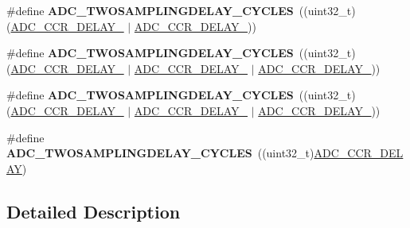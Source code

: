 \begin{DoxyCompactItemize}
\item 
\mbox{\label{group___a_d_c__delay__between__2__sampling__phases_gaba99083f97b9869ad8397a04601ad1cb}} 
\#define {\bfseries A\+D\+C\+\_\+\+T\+W\+O\+S\+A\+M\+P\+L\+I\+N\+G\+D\+E\+L\+A\+Y\+\_\+C\+Y\+C\+L\+ES}~((uint32\+\_\+t)(\mbox{\hyperlink{group___peripheral___registers___bits___definition_gae0216de7d6fcfa507c9aa1400972d862}{A\+D\+C\+\_\+\+C\+C\+R\+\_\+\+D\+E\+L\+A\+Y\+\_}} $\vert$ \mbox{\hyperlink{group___peripheral___registers___bits___definition_ga17f85cbda5dcf9a392a29befb73c6ceb}{A\+D\+C\+\_\+\+C\+C\+R\+\_\+\+D\+E\+L\+A\+Y\+\_}}))
\item 
\mbox{\label{group___a_d_c__delay__between__2__sampling__phases_ga3d4626768769515ca85ead5834564dd4}} 
\#define {\bfseries A\+D\+C\+\_\+\+T\+W\+O\+S\+A\+M\+P\+L\+I\+N\+G\+D\+E\+L\+A\+Y\+\_\+C\+Y\+C\+L\+ES}~((uint32\+\_\+t)(\mbox{\hyperlink{group___peripheral___registers___bits___definition_gae0216de7d6fcfa507c9aa1400972d862}{A\+D\+C\+\_\+\+C\+C\+R\+\_\+\+D\+E\+L\+A\+Y\+\_}} $\vert$ \mbox{\hyperlink{group___peripheral___registers___bits___definition_ga17f85cbda5dcf9a392a29befb73c6ceb}{A\+D\+C\+\_\+\+C\+C\+R\+\_\+\+D\+E\+L\+A\+Y\+\_}} $\vert$ \mbox{\hyperlink{group___peripheral___registers___bits___definition_ga22b71e9df8b1fca93802ad602341eb0b}{A\+D\+C\+\_\+\+C\+C\+R\+\_\+\+D\+E\+L\+A\+Y\+\_}}))
\item 
\mbox{\label{group___a_d_c__delay__between__2__sampling__phases_ga261b9cf07c6e2c6afd7327a629854408}} 
\#define {\bfseries A\+D\+C\+\_\+\+T\+W\+O\+S\+A\+M\+P\+L\+I\+N\+G\+D\+E\+L\+A\+Y\+\_\+C\+Y\+C\+L\+ES}~((uint32\+\_\+t)(\mbox{\hyperlink{group___peripheral___registers___bits___definition_gae0216de7d6fcfa507c9aa1400972d862}{A\+D\+C\+\_\+\+C\+C\+R\+\_\+\+D\+E\+L\+A\+Y\+\_}} $\vert$ \mbox{\hyperlink{group___peripheral___registers___bits___definition_ga17f85cbda5dcf9a392a29befb73c6ceb}{A\+D\+C\+\_\+\+C\+C\+R\+\_\+\+D\+E\+L\+A\+Y\+\_}} $\vert$ \mbox{\hyperlink{group___peripheral___registers___bits___definition_ga6d0d5785cb6c75e700517e88af188573}{A\+D\+C\+\_\+\+C\+C\+R\+\_\+\+D\+E\+L\+A\+Y\+\_}}))
\item 
\mbox{\label{group___a_d_c__delay__between__2__sampling__phases_ga1a15072ba873631146f76de174ec66ab}} 
\#define {\bfseries A\+D\+C\+\_\+\+T\+W\+O\+S\+A\+M\+P\+L\+I\+N\+G\+D\+E\+L\+A\+Y\+\_\+C\+Y\+C\+L\+ES}~((uint32\+\_\+t)\mbox{\hyperlink{group___peripheral___registers___bits___definition_ga9c13aa04949ed520cf92613d3a619198}{A\+D\+C\+\_\+\+C\+C\+R\+\_\+\+D\+E\+L\+AY}})
\end{DoxyCompactItemize}


\subsection{Detailed Description}
